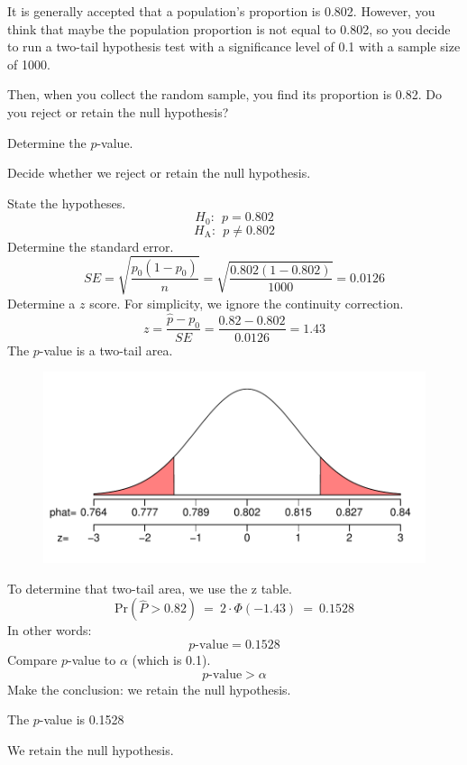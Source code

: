 
\begin{question}
It is generally accepted that a population's proportion is 0.802.
However, you think that maybe the population proportion is not equal to
0.802, so you decide to run a two-tail hypothesis test with a
significance level of 0.1 with a sample size of 1000.

Then, when you collect the random sample, you find its proportion is
0.82. Do you reject or retain the null hypothesis?
\begin{answerlist}
  \item Determine the \(p\)-value.
  \item Decide whether we reject or retain the null hypothesis.
\end{answerlist}
\end{question}

\begin{solution}
State the hypotheses. \[H_0: ~~ p = 0.802 \]
\[H_\text{A}: ~~ p \ne 0.802\] Determine the standard error.
\[SE = \sqrt{\frac{p_0(1-p_0)}{n}} = \sqrt{\frac{0.802(1-0.802)}{1000}} = 0.0126 \]
Determine a \(z\) score. For simplicity, we ignore the continuity
correction.
\[z = \frac{\hat{p}-p_0}{SE} = \frac{0.82-0.802}{0.0126} = 1.43 \] The
\(p\)-value is a two-tail area.

\begin{figure}[htbp]
\centering
\includegraphics{p_single_test_twotail-1.pdf}
\caption{}
\end{figure}

To determine that two-tail area, we use the z table.
\[\text{Pr}\left(\hat{P} > 0.82\right) ~=~ 2\cdot \Phi(-1.43) ~=~ 0.1528 \]
In other words: \[p\text{-value} = 0.1528\] Compare \(p\)-value to
\(\alpha\) (which is 0.1). \[p\text{-value} > \alpha \] Make the
conclusion: we retain the null hypothesis.
\begin{answerlist}
  \item The \(p\)-value is 0.1528
  \item We retain the null hypothesis.
\end{answerlist}
\end{solution}

